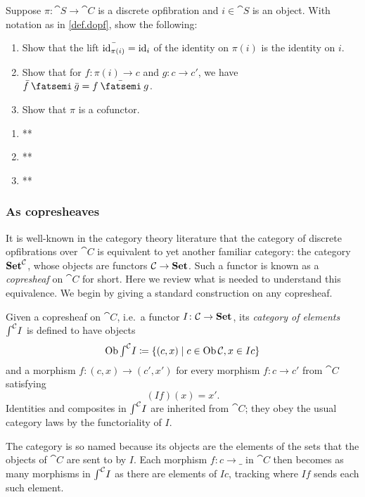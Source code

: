 \documentclass[Book-Poly]{subfiles}
\begin{document}
\begin{exercise}\label{exc.dopf_cof}
Suppose $\pi\colon\cat{S}\to\cat{C}$ is a discrete opfibration and $i\in\cat{S}
$ is an object. With notation as in \cref{def.dopf}, show the following:
\begin{enumerate}
	\item Show that the lift $\bar{\mathrm{id}_{\pi(i)}}=\mathrm{id}_i$ of the identity on $\pi(i)$ is the identity on $i$.
	\item Show that for $f\colon\pi(i)\to c$ and $g\colon c\to c'$, we have $\bar{f}\then\bar{g}=\bar{f\then g}$.
	\item Show that $\pi$ is a cofunctor.
\qedhere
\end{enumerate}
\begin{solution}
\begin{enumerate}
    \item **
    \item **
    \item **
\end{enumerate}
\end{solution}
\end{exercise}





\subsubsection{As copresheaves}

It is well-known in the category theory literature that the category of discrete opfibrations over $\cat{C}$ is equivalent to yet another familiar category: the category $\mathbf{Set}^{\mathcal{C}}$, whose objects are functors $\mathcal{C}\to\mathbf{Set}$.
Such a functor is known as a \emph{copresheaf} on $\cat{C}$ for short.
Here we review what is needed to understand this equivalence.
We begin by giving a standard construction on any copresheaf.

\begin{definition}\label{def.cat_elements}
Given a copresheaf on $\cat{C}$, i.e.\ a functor $I\colon\mathcal{C}\to\mathbf{Set}$, its \emph{category of elements} $\textstyle{\int}^{\mathcal{C}}I$ is defined to have objects
\[
    \operatorname{Ob}\textstyle{\int}^{\mathcal{C}}I\coloneqq\{(c,x)\mid c\in\operatorname{Ob}\mathcal{C}, x\in Ic\}
\]
and a morphism $f\colon(c,x)\to(c',x')$ for every morphism $f\colon c\to c'$ from $\cat{C}$ satisfying
\[
    (If)(x)=x'.
\]
Identities and composites in $\textstyle{\int}^{\mathcal{C}}I$ are inherited from $\cat{C}$; they obey the usual category laws by the functoriality of $I$.

The category is so named because its objects are the elements of the sets that the objects of $\cat{C}$ are sent to by $I$.
Each morphism $f\colon c\to\_$ in $\cat{C}$ then becomes as many morphisms in $\textstyle{\int}^{\mathcal{C}}I$ as there are elements of $Ic$, tracking where $If$ sends each such element.
\end{definition}
\end{document}
